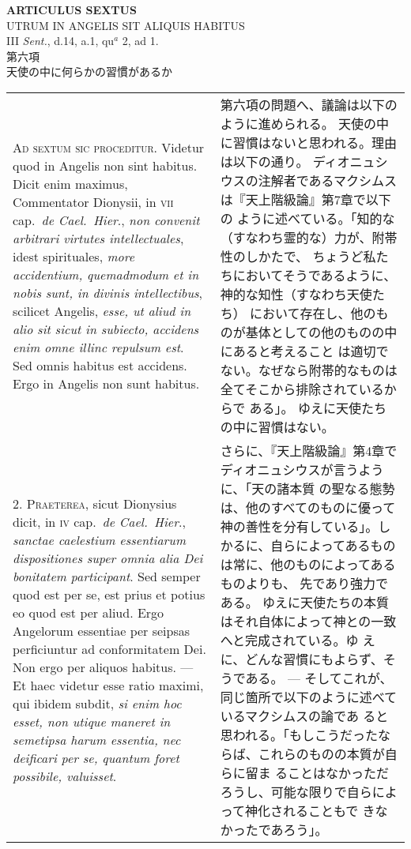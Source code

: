 \documentclass[10pt]{jsarticle} %
\begin{document}
\begin{center}
{\Large {\bf ARTICULUS SEXTUS}}\\
{\large UTRUM IN ANGELIS SIT ALIQUIS HABITUS}\\
{\footnotesize III {\itshape Sent.}, d.14, a.1, qu$^{a}$ 2, ad 1.}\\
{\Large 第六項\\天使の中に何らかの習慣があるか}
\end{center}

\begin{longtable}{p{21em}p{21em}}

{\scshape Ad sextum sic proceditur}. Videtur quod in Angelis non sint
habitus. Dicit enim maximus, Commentator Dionysii, in {\scshape vii}
cap.~{\itshape de Cael.~Hier}., {\itshape non convenit arbitrari
virtutes intellectuales}, idest spirituales, {\itshape more
accidentium, quemadmodum et in nobis sunt, in divinis intellectibus},
scilicet Angelis, {\itshape esse, ut aliud in alio sit sicut in
subiecto, accidens enim omne illinc repulsum est}. Sed omnis habitus
est accidens. Ergo in Angelis non sunt habitus.

&

第六項の問題へ、議論は以下のように進められる。
天使の中に習慣はないと思われる。理由は以下の通り。
ディオニュシウスの注解者であるマクシムスは『天上階級論』第7章で以下の
 ように述べている。「知的な（すなわち霊的な）力が、附帯性のしかたで、
 ちょうど私たちにおいてそうであるように、神的な知性（すなわち天使たち）
 において存在し、他のものが基体としての他のものの中にあると考えること
 は適切でない。なぜなら附帯的なものは全てそこから排除されているからで
 ある」。
ゆえに天使たちの中に習慣はない。

\\



2. {\scshape Praeterea}, sicut Dionysius dicit, in {\scshape iv}
cap.~{\itshape de Cael.~Hier}., {\itshape sanctae caelestium essentiarum
dispositiones super omnia alia Dei bonitatem participant}. Sed semper
quod est per se, est prius et potius eo quod est per aliud. Ergo
Angelorum essentiae per seipsas perficiuntur ad conformitatem Dei. Non
ergo per aliquos habitus. --- Et haec videtur esse ratio maximi, qui
ibidem subdit, {\itshape si enim hoc esset, non utique maneret in semetipsa
harum essentia, nec deificari per se, quantum foret possibile,
valuisset}.

&

さらに、『天上階級論』第4章でディオニュシウスが言うように、「天の諸本質
 の聖なる態勢は、他のすべてのものに優って神の善性を分有している」。し
 かるに、自らによってあるものは常に、他のものによってあるものよりも、
 先であり強力である。
ゆえに天使たちの本質はそれ自体によって神との一致へと完成されている。ゆ
 えに、どんな習慣にもよらず、そうである。
--- そしてこれが、同じ箇所で以下のように述べているマクシムスの論であ
 ると思われる。「もしこうだったならば、これらのものの本質が自らに留ま
 ることはなかっただろうし、可能な限りで自らによって神化されることもで
 きなかったであろう」。


\end{longtable}
\end{document}
